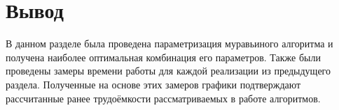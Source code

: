 \section*{Вывод}

В данном разделе была проведена параметризация муравьиного алгоритма и получена наиболее оптимальная комбинация его параметров. Также были проведены замеры времени работы для каждой реализации из предыдущего раздела. Полученные на основе этих замеров графики подтверждают рассчитанные ранее трудоёмкости рассматриваемых в работе алгоритмов.

\clearpage
